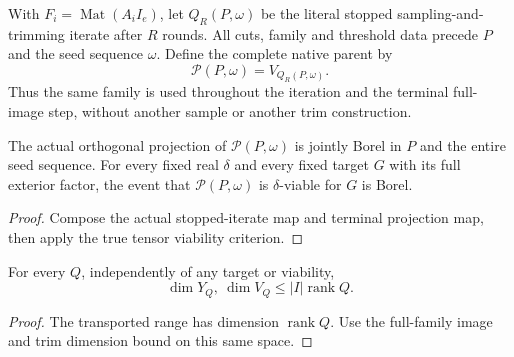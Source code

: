 \begin{definition}
    \label{def:canonical_half_sampling_parent}
    \leanok
    With $F_i=\operatorname{Mat}(A_iI_e)$, let $Q_R(P,\omega)$ be the literal
    stopped sampling-and-trimming iterate after $R$ rounds. All cuts,
    family and threshold data precede $P$ and the seed sequence $\omega$.
    Define the complete native parent by
    \[
        \mathcal P(P,\omega)=V_{Q_R(P,\omega)}.
    \]
    Thus the same family is used throughout the iteration and the terminal
    full-image step, without another sample or another trim construction.
\end{definition}

\begin{lemma}
    \label{lem:borel_canonical_half_sampling_parent}
    \leanok
    The actual orthogonal projection of $\mathcal P(P,\omega)$ is jointly
    Borel in $P$ and the entire seed sequence. For every fixed real $\delta$
    and every fixed target $G$ with its full exterior factor, the event that
    $\mathcal P(P,\omega)$ is $\delta$-viable for $G$ is Borel.
\end{lemma}
\begin{proof}\leanok
    Compose the actual stopped-iterate map and terminal projection map,
    then apply the true tensor viability criterion.
\end{proof}

\begin{lemma}
    \label{lem:native_family_terminal_dimensions}
    \leanok
    For every $Q$, independently of any target or viability,
    \[
        \dim Y_Q,\ \dim V_Q\le |I|\operatorname{rank}Q.
    \]
\end{lemma}
\begin{proof}\leanok
    The transported range has dimension $\operatorname{rank}Q$. Use the
    full-family image and trim dimension bound on this same space.
\end{proof}

